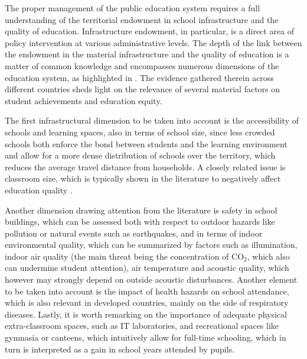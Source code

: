 \documentclass[openany]{book}
\begin{document}
The proper management of the public education system requires a full understanding of the territorial endowment in school infrastructure and the quality of education. Infrastructure endowment, in particular, is a direct area of policy intervention at various administrative levels. The depth of the link between the endowment in the material infrastructure and the quality of education is a matter of common knowledge and encompasses numerous dimensions of the education system, as highlighted in \cite{WB}. The evidence gathered therein across different countries sheds light on the relevance of several material factors on student achievements and education equity.

The first infrastructural dimension to be taken into account is the accessibility of schools and learning spaces, also in terms of school size, since less crowded schools both enforce the bond between students and the learning environment and allow for a more dense distribution of schools over the territory, which reduces the average travel distance from households. A closely related issue is classroom size, which is typically shown in the literature to negatively affect education quality \citep{WB}.

Another dimension drawing attention from the literature is safety in school buildings, which can be assessed both with respect to outdoor hazards like pollution or natural events such as earthquakes, and in terms of indoor environmental quality, which can be summarized by factors such as illumination, indoor air quality (the main threat being the concentration of $\mathrm{CO_{2}}$, which also can undermine student attention), air temperature and acoustic quality, which however may strongly depend on outside acoustic disturbances. Another element to be taken into account is the impact of health hazards on school attendance, which is also relevant in developed countries, mainly on the side of respiratory diseases. Lastly, it is worth remarking on the importance of adequate physical extra-classroom spaces, such as IT laboratories, and recreational spaces like gymnasia or canteens, which intuitively allow for full-time schooling, which in turn is interpreted as a gain in school years attended by pupils.
\end{document}
